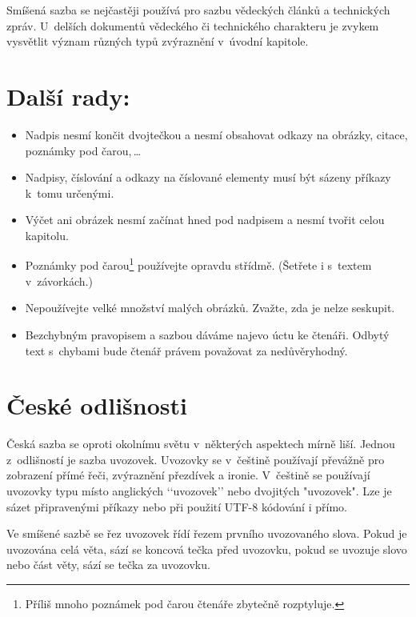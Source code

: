 \documentclass[twocolumn, a4paper]{article}
\begin{document}
Smíšená sazba se nejčastěji používá pro sazbu vědeckých článků a technických zpráv. U~delších dokumentů vědeckého či technického charakteru je zvykem vysvětlit význam různých typů zvýraznění v~úvodní kapitole.

\section {Další rady:} \label{dalsi-rady}
\begin{itemize}

\item Nadpis nesmí končit dvojtečkou a nesmí obsahovat odkazy na obrázky, citace, poznámky pod čarou,\,\dots

\item Nadpisy, číslování a odkazy na číslované elementy musí být sázeny příkazy k~tomu určenými.

\item Výčet ani obrázek nesmí začínat hned pod nadpisem a nesmí tvořit celou kapitolu.

\item Poznámky pod čarou\footnote{Příliš mnoho poznámek pod čarou čtenáře zbytečně rozptyluje.} používejte opravdu střídmě. (Šetřete i s~textem v~závorkách.)

\item Nepoužívejte velké množství malých obrázků. Zvažte, zda je nelze seskupit.

\item Bezchybným pravopisem a sazbou dáváme najevo úctu ke čtenáři. Odbytý text s~chybami bude čtenář právem považovat za nedůvěryhodný.

\end{itemize}



\section{České odlišnosti}
Česká sazba se oproti okolnímu světu v~některých aspektech mírně liší. Jednou z~odlišností je sazba uvozovek. Uvozovky se v~češtině používají převážně pro zobrazení přímé řeči, zvýraznění přezdívek a ironie. V~češtině se používají uvozovky typu  místo anglických ‘‘uvozovek’’ nebo dvojitých "uvozovek". Lze je sázet připravenými příkazy nebo při použití UTF-8 kódování i přímo.

Ve smíšené sazbě se řez uvozovek řídí řezem prvního uvozovaného slova. Pokud je uvozována celá věta, sází se koncová tečka před uvozovku, pokud se uvozuje slovo nebo část věty, sází se tečka za uvozovku.
\end{document}
